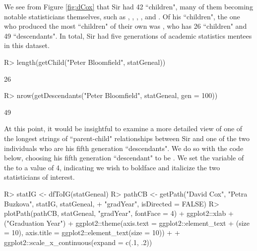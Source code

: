 \documentclass[article,shortnames]{jss}
\begin{document}
We see from Figure \ref{fig:dCox} that Sir  had 42 ``children", many of them becoming notable statisticians themselves, such as , , , , and . Of his ``children", the one who produced the most ``children" of their own was , who has 26 ``children" and 49 ``descendants". In total, Sir  had five generations of academic statistics mentees in this dataset.

\begin{CodeChunk}
\begin{CodeInput}
R> length(getChild("Peter Bloomfield", statGeneal))
\end{CodeInput}
\begin{CodeOutput}
[1] 26
\end{CodeOutput}
\begin{CodeInput}
R> nrow(getDescendants("Peter Bloomfield", statGeneal, gen = 100))
\end{CodeInput}
\begin{CodeOutput}
[1] 49
\end{CodeOutput}
\end{CodeChunk}

At this point, it would be insightful to examine a more detailed view of one of the longest strings of ``parent-child" relationships between Sir  and one of the two individuals who are his fifth generation ``descendants". We do so with the code below, choosing his fifth generation ``descendant" to be . We set the  variable of the  to a value of 4, indicating we wish to boldface and italicize the two statisticians of interest.

\begin{CodeChunk}
\begin{CodeInput}
R> statIG <- dfToIG(statGeneal)
R> pathCB <- getPath("David Cox", "Petra Buzkova", statIG, statGeneal,
+    "gradYear", isDirected = FALSE)
R> plotPath(pathCB, statGeneal, "gradYear", fontFace = 4) + ggplot2::xlab
+    ("Graduation Year") + ggplot2::theme(axis.text = ggplot2::element_text
+    (size = 10), axis.title = ggplot2::element_text(size = 10)) +
+    ggplot2::scale_x_continuous(expand = c(.1, .2))
\end{CodeInput}
\end{CodeChunk}
\end{document}
